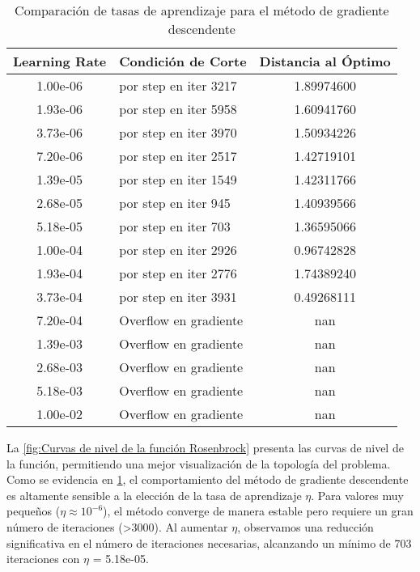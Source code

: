 \documentclass{tp02}
\begin{document}
    \begin{table}[h]
    \centering
    \begin{tabular}{|c|l|c|}
    \hline
    Learning Rate & \multicolumn{1}{c|}{Condición de Corte} & Distancia al Óptimo \\
    \hline
    1.00e-06 & por step en iter 3217 & 1.89974600 \\
    1.93e-06 & por step en iter 5958 & 1.60941760 \\
    3.73e-06 & por step en iter 3970 & 1.50934226 \\
    7.20e-06 & por step en iter 2517 & 1.42719101 \\
    1.39e-05 & por step en iter 1549 & 1.42311766 \\
    2.68e-05 & por step en iter 945 & 1.40939566 \\
    5.18e-05 & por step en iter 703 & 1.36595066 \\
    1.00e-04 & por step en iter 2926 & 0.96742828 \\
    1.93e-04 & por step en iter 2776 & 1.74389240 \\
    3.73e-04 & por step en iter 3931 & 0.49268111 \\
    7.20e-04 & Overflow en gradiente & nan \\
    1.39e-03 & Overflow en gradiente & nan \\
    2.68e-03 & Overflow en gradiente & nan \\
    5.18e-03 & Overflow en gradiente & nan \\
    1.00e-02 & Overflow en gradiente & nan \\
    \hline
    \end{tabular}
    \caption{Comparación de tasas de aprendizaje para el método de gradiente descendente}
    \label{tab:learning-rates}
    \end{table} 

La \ref{fig:Curvas de nivel de la función Rosenbrock} presenta las curvas de nivel 
de la función, permitiendo una mejor visualización de la topología del
problema. Como se evidencia en \ref{tab:learning-rates}, el 
comportamiento del método de gradiente descendente es altamente sensible a la 
elección de la tasa de aprendizaje $\eta$. Para valores muy pequeños ($\eta \approx 10^{-6}$), el 
método converge de manera estable pero requiere un gran número de iteraciones 
(>3000). Al aumentar $\eta$, observamos una reducción significativa en el número de 
iteraciones necesarias, alcanzando un mínimo de 703 iteraciones con 
$\eta$ = 5.18e-05.
\end{document}
